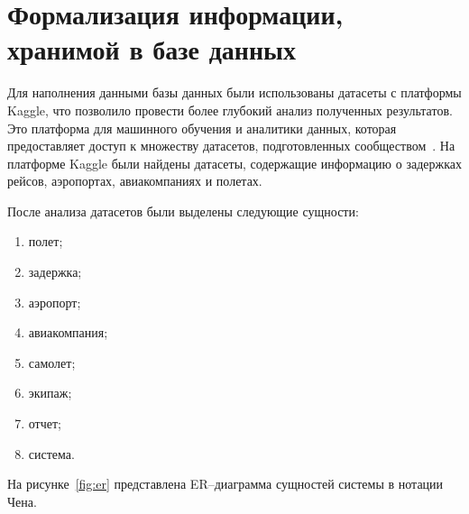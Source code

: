%
%
%

\section{Формализация информации, хранимой в базе данных}

Для наполнения данными базы данных были использованы датасеты с платформы Kaggle, что позволило провести более глубокий анализ полученных результатов.
Это платформа для машинного обучения и аналитики данных, которая предоставляет доступ к множеству датасетов, подготовленных сообществом~\cite{kaggle}.
На платформе Kaggle были найдены датасеты, содержащие информацию о задержках рейсов, аэропортах, авиакомпаниях и полетах.

После анализа датасетов были выделены следующие сущности:
\begin{enumerate}[label=\arabic*)]
    \item полет;
    \item задержка;
    \item аэропорт;
    \item авиакомпания;
    \item самолет;
    \item экипаж;
    \item отчет;
    \item система.
\end{enumerate}

На рисунке~\ref{fig:er} представлена ER--диаграмма сущностей системы в нотации Чена.

